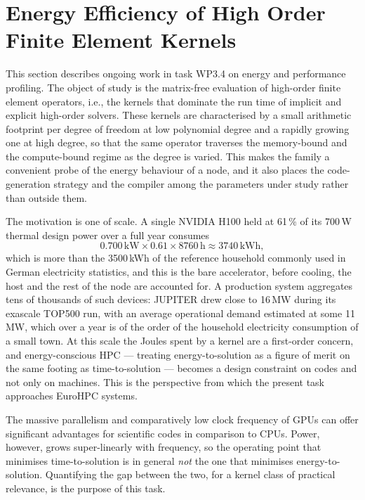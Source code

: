 \section{Energy Efficiency of High Order Finite Element Kernels}
\label{sec:energy}

This section describes ongoing work in task WP3.4 on energy and performance profiling.
The object of study is the matrix-free evaluation of high-order finite element operators, i.e., the kernels that dominate the run time of implicit and explicit high-order solvers.
These kernels are characterised by a small arithmetic footprint per degree of freedom at low polynomial degree and a rapidly growing one at high degree, so that the same operator traverses the memory-bound and the compute-bound regime as the degree is varied.
This makes the family a convenient probe of the energy behaviour of a node, and it also places the code-generation strategy and the compiler among the parameters under study rather than outside them.

The motivation is one of scale.
A single NVIDIA H100 held at 61\,\% of its 700\,W thermal design power over a full year consumes
%
\[
  0.700\,\mathrm{kW} \times 0.61 \times 8760\,\mathrm{h} \approx 3740\,\mathrm{kWh},
\]
%
which is more than the 3500\,kWh of the reference household commonly used in German electricity statistics, and this is the bare accelerator, before cooling, the host and the rest of the node are accounted for.
A production system aggregates tens of thousands of such devices: JUPITER drew close to 16\,MW during its exascale TOP500 run, with an average operational demand estimated at some 11\,MW, which over a year is of the order of the household electricity consumption of a small town.
At this scale the Joules spent by a kernel are a first-order concern, and energy-conscious HPC --- treating energy-to-solution as a figure of merit on the same footing as time-to-solution --- becomes a design constraint on codes and not only on machines.
This is the perspective from which the present task approaches EuroHPC systems.


The massive parallelism and comparatively low clock frequency of GPUs can offer significant advantages for scientific codes in comparison to CPUs.
Power, however, grows super-linearly with frequency, so the operating point that minimises time-to-solution is in general \emph{not} the one that minimises energy-to-solution.
Quantifying the gap between the two, for a kernel class of practical relevance, is the purpose of this task.

